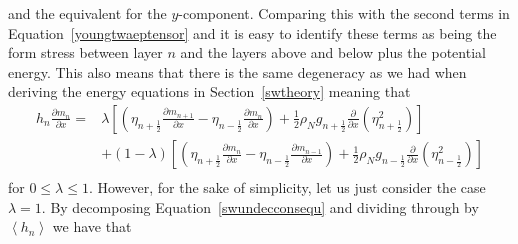 \documentclass[10pt,a4paper]{report}
\newcommand*\nthkmean[1]{\left\langle{#1}\right\rangle}
\newcommand*\equref[1]{Equation~\eqref{#1}}
\newcommand*\secref[1]{Section~\ref{#1}}
\newcommand*{\half}{\frac{1}{2}}
\begin{document}
    and the equivalent for the $y$-component. Comparing this with the second 
    terms in \equref{youngtwaeptensor} and it is easy to identify these terms as being
    the form stress between layer $n$ and the layers above and below plus the potential
    energy. This also means that there is the same degeneracy as we had when 
    deriving the energy equations in \secref{swtheory} meaning that 
    \begin{equation}
    \begin{split}
    h_{n}\frac{\partial m_{n}}{\partial x}
    =&\lambda\left[\left(\eta_{n+\half}\frac{\partial m_{n+1}}{\partial x}
    -\eta_{n-\half}\frac{\partial m_{n}}{\partial x}\right)
    +\half\rho_{N}g_{n+\half}\frac{\partial }{\partial x}\left(\eta_{n+\half}^{2}\right)\right]\\
    &+\left(1-\lambda\right)\left[\left(\eta_{n+\half}\frac{\partial m_{n}}{\partial x}
    -\eta_{n-\half}\frac{\partial m_{n-1}}{\partial x}\right)
    +\half\rho_{N}g_{n-\half}\frac{\partial }{\partial x}\left(\eta_{n-\half}^{2}\right)\right]\\
    \end{split}
    \end{equation}
    for $0\leq\lambda\leq1$. However, for the sake of simplicity, let us just consider
    the case $\lambda = 1$. By decomposing \equref{swundecconsequ} and dividing 
    through by $\nthkmean{h_{n}}$ we have that 
\end{document}
